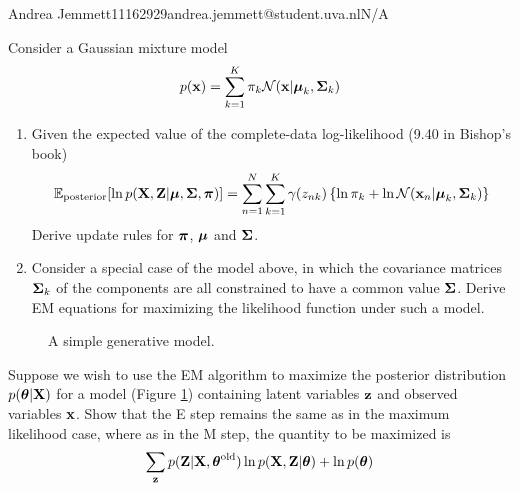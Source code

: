 \documentclass{amsmlaj}
\begin{document}
{Andrea Jemmett}{11162929}{andrea.jemmett@student.uva.nl}{N/A}


\begin{problem}
Consider a Gaussian mixture model
$$
p(\bm{\mathbf{x}}) = \sum_{k=1}^K  \pi_k \mathcal{N}(\bm{\mathbf{x}}|\bm{\mathbf{\mu}}_k,\bm{\mathbf{\Sigma}}_k)
$$
\begin{enumerate}
\item Given the expected value of the complete-data log-likelihood (9.40 in Bishop's book)
$$
\mathbb{E}_{\text{posterior}}[\ln p(\bm{\mathbf{X}},\bm{\mathbf{Z}}|\bm{\mathbf{\mu}}, \bm{\mathbf{\Sigma}},\bm{\mathbf{\pi}})] = \sum_{n=1}^N\sum_{k=1}^K \gamma(z_{nk}) \left\{ \ln\pi_k + \ln\mathcal{N}(\bm{\mathbf{x}}_n|\bm{\mathbf{\mu}}_k,\bm{\mathbf{\Sigma}}_k)\right\} \label{eq:ex_post}
$$
Derive update rules for $\bm{\mathbf{\pi}}$, $\bm{\mathbf{\mu}}$ and $\bm{\mathbf{\Sigma}}$. 

\item Consider a special case of the model above, in which the covariance matrices $\bm{\mathbf{\Sigma}}_k$ of the components are all constrained to have a common value $\bm{\mathbf{\Sigma}}$. Derive EM equations for maximizing the likelihood function under such a model.
\end{enumerate}

\end{problem}

\begin{problem}
\begin{figure}[htbp]
\centering
{}
\caption{A simple generative model.}
\label{fig:gm}
\end{figure}
Suppose we wish to use the EM algorithm to maximize the posterior distribution $p(\bm{\mathbf{\theta}}|\bm{\mathbf{X}})$ for a model (Figure \ref{fig:gm}) containing latent variables $\bm{\mathbf{z}}$ and observed variables $\bm{\mathbf{x}}$. Show that the E step remains the same as in the maximum likelihood case, where as in the M step, the quantity to be maximized is
$$
\sum_{\bm{\mathbf{z}}} p(\bm{\mathbf{Z}}|\bm{\mathbf{X}},\bm{\mathbf{\theta}}^{\text{old}})\ln p(\bm{\mathbf{X}},\bm{\mathbf{Z}}|\bm{\mathbf{\theta}}) + \ln p(\bm{\mathbf{\theta}})
$$
\end{problem}
\end{document}

